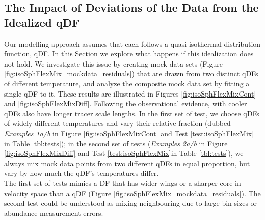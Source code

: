\subsection{The Impact of Deviations of the Data from the Idealized qDF} \label{sec:results_mixedDFs}

Our modelling approach assumes that each \MAP{} follows a quasi-isothermal distribution function, qDF. In this Section we explore what happens if this idealization does not hold. We investigate this issue by creating mock data sets (Figure \ref{fig:isoSphFlexMix_mockdata_residuals}) that are drawn from two distinct qDFs of different temperature, and analyze the composite mock data set by fitting a single qDF to it. These results are illustrated in Figures \ref{fig:isoSphFlexMixCont} and \ref{fig:isoSphFlexMixDiff}. Following the observational evidence, \MAPs{} with cooler qDFs also have longer tracer scale lengths. In the first set of test, we choose qDFs of widely different temperatures and vary their relative fraction (dubbed \emph{Examples 1a/b} in Figure \ref{fig:isoSphFlexMixCont} and Test \ref{test:isoSphFlexMix} in Table \ref{tbl:tests}); in the second set of tests (\emph{Examples 2a/b} in Figure \ref{fig:isoSphFlexMixDiff} and Test \ref{test:isoSphFlexMix}in Table \ref{tbl:tests}), we always mix mock data points from two different qDFs in equal proportion, but vary by how much the qDF's temperatures differ. 
\\The first set of tests mimics a DF that has wider wings or a sharper core in velocity space than a qDF (Figure \ref{fig:isoSphFlexMix_mockdata_residuals}). The second test could be understood as mixing neighbouring \MAPs{} due to large bin sizes or abundance measurement errors.

